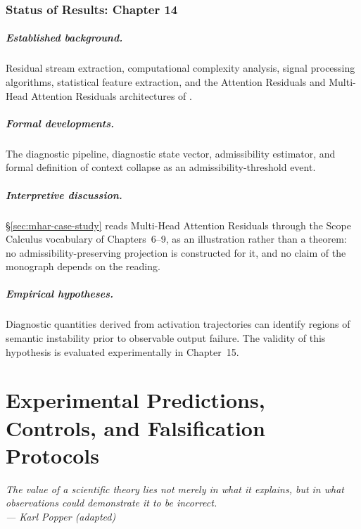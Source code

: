 \documentclass[11pt,twoside,openright]{book}
\numberwithin{equation}{chapter}
\theoremstyle{definition}
\theoremstyle{plain}
\theoremstyle{remark}
\theoremstyle{definition}
\begin{document}
\subsection*{Status of Results: Chapter 14}

\paragraph{Established background.} Residual stream extraction,
computational complexity analysis, signal processing algorithms,
statistical feature extraction, and the Attention Residuals and
Multi-Head Attention Residuals architectures of \citet{Luo2026}.

\paragraph{Formal developments.} The diagnostic pipeline, diagnostic
state vector, admissibility estimator, and formal definition of context
collapse as an admissibility-threshold event.

\paragraph{Interpretive discussion.} \S\ref{sec:mhar-case-study} reads
Multi-Head Attention Residuals through the Scope Calculus vocabulary of
Chapters~6--9, as an illustration rather than a theorem: no
admissibility-preserving projection is constructed for it, and no claim
of the monograph depends on the reading.

\paragraph{Empirical hypotheses.} Diagnostic quantities derived from
activation trajectories can identify regions of semantic instability
prior to observable output failure. The validity of this hypothesis is
evaluated experimentally in Chapter~15.

\chapter{Experimental Predictions, Controls, and Falsification Protocols}
\label{ch:experiments}

\vspace{1em}
\begin{flushright}\itshape
The value of a scientific theory lies not merely in what it explains, but
in what observations could demonstrate it to be incorrect.\\
\upshape --- Karl Popper (adapted)
\end{flushright}
\vspace{1em}
\end{document}
